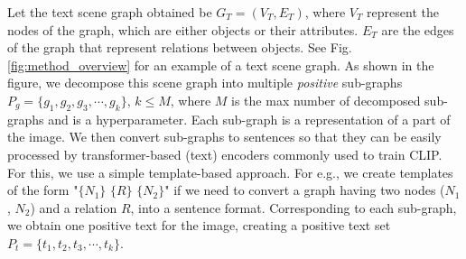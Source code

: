 \documentclass[11pt]{article}
\begin{document}
Let the text scene graph obtained be $G_T = (V_T, E_T)$, where $V_T$ represent the nodes of the graph, which are either objects or their attributes. $E_T$ are the edges of the graph that represent relations between objects. See Fig. \ref{fig:method_overview} for an example of a text scene graph. As shown in the figure, we decompose this scene graph into multiple \textit{positive} sub-graphs $P_g = \{g_1, g_2, g_3, \cdots , g_k\}$, $k \leq M$, where $M$ is the max number of decomposed sub-graphs and is a hyperparameter. Each sub-graph is a representation of a part of the image. We then convert sub-graphs to sentences so that they can be easily processed by transformer-based (text) encoders commonly used to train CLIP. For this, we use a simple template-based approach. For e.g., we create templates of the form "$\{N_1\}$ $\{R\}$ $\{N_2\}$" if we need to convert a graph having two nodes ($N_1$, $N_2$) and a relation $R$, into a sentence format. Corresponding to each sub-graph, we obtain one positive text for the image, creating a positive text set $P_t = \{t_1, t_2, t_3, \cdots , t_k\}$.
\end{document}
